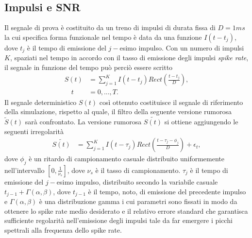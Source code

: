 \subsection{Impulsi e SNR}

Il segnale di prova è costituito da un treno di impulsi di durata fissa di $D=1ms$ la cui specifica forma funzionale nel tempo è data da una funzione $I(t-t_{j})$, dove $t_{j}$ è il tempo di emissione del $j-$esimo impulso. Con un numero di impulsi $K$, spaziati nel tempo in accordo con il tasso di emissione degli impulsi {\it spike rate}, il segnale in funzione del tempo può perciò essere scritto 
%
\begin{align*}
S(t) & = \sum_{j=1}^{K} I(t - t_{j})Rect(\frac{t-t_{j}}{D}),   \\
\quad t & = 0, ..., T.
\end{align*}
%
Il segnale deterministico $S(t)$ così ottenuto costituisce il segnale di riferimento della simulazione, rispetto al quale, il filtro della seguente versione rumorosa $\tilde{S}(t)$ sarà confrontato.
La versione rumorosa $\tilde{S(t)}$ si ottiene aggiungendo le seguenti irregolarità
%
\begin{align*}
\tilde{S(t)} & = \sum_{j=1}^{K} I(t - \tau_{j})Rect(\frac{t-\tau_{j}-\phi_{j}}{D}) 
 + \epsilon_{t},
 \end{align*}
%
dove $\phi_{j}$ è un ritardo di campionamento casuale distribuito uniformemente nell'intervallo $[0,\frac{1}{\nu_{s}}]$, dove $\nu_{s}$ è il tasso di campionamento. $\tau_{j}$ è il tempo di emissione del $j-$esimo impulso, distribuito secondo la variabile casuale $t_{j-1}+\Gamma(\alpha, \beta)$, dove $t_{j-1}$ è il tempo, noto, di emissione del precedente impulso e $\Gamma(\alpha, \beta)$ è una distribuzione gamma i cui parametri sono fissati in modo da ottenere lo spike rate medio desiderato e il relativo errore standard che garantisca sufficiente regolarità nell'emissione degli impulsi tale da far emergere i picchi spettrali alla frequenza dello spike rate.
%

